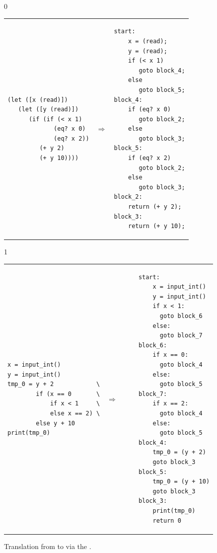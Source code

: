 \documentclass[7x10]{TimesAPriori_MIT}%
\def\racketEd{0}
\def\pythonEd{1}
\providecommand{\BookEdition}{1}
\let\edition\BookEdition
\newcommand{\pythonColor}[0]{}
\numberwithin{theorem}{chapter}
\numberwithin{definition}{chapter}
\numberwithin{equation}{chapter}
\begin{document}
\begin{figure}[tbp]
\begin{tcolorbox}[colback=white]
{\if\edition\racketEd        
\begin{tabular}{lll}
\begin{minipage}{0.4\textwidth}
\begin{lstlisting}
(let ([x (read)])
   (let ([y (read)])
      (if (if (< x 1)
             (eq? x 0)
             (eq? x 2))
         (+ y 2)
         (+ y 10))))
\end{lstlisting}
\end{minipage}
&
$\Rightarrow$
&
\begin{minipage}{0.55\textwidth}
\begin{lstlisting}
start:
    x = (read);
    y = (read);
    if (< x 1)
       goto block_4;
    else
       goto block_5;
block_4:
    if (eq? x 0)
       goto block_2;
    else
       goto block_3;
block_5:
    if (eq? x 2)
       goto block_2;
    else
       goto block_3;
block_2:
    return (+ y 2);
block_3:
    return (+ y 10);
\end{lstlisting}
\end{minipage}
\end{tabular} 
\fi}
{\if\edition\pythonEd\pythonColor
\begin{tabular}{lll}
\begin{minipage}{0.4\textwidth}
\begin{lstlisting}
x = input_int()
y = input_int()
tmp_0 = y + 2            \
        if (x == 0       \
            if x < 1     \
            else x == 2) \
        else y + 10
print(tmp_0)
\end{lstlisting}
\end{minipage}
&
$\Rightarrow\qquad$
&
\begin{minipage}{0.55\textwidth}
\begin{lstlisting}
start:
    x = input_int()
    y = input_int()
    if x < 1:
      goto block_6
    else:
      goto block_7
block_6:
    if x == 0:
      goto block_4
    else:
      goto block_5
block_7:
    if x == 2:
      goto block_4
    else:
      goto block_5
block_4:
    tmp_0 = (y + 2)
    goto block_3
block_5:
    tmp_0 = (y + 10)
    goto block_3
block_3:
    print(tmp_0)
    return 0
\end{lstlisting}
\end{minipage}
\end{tabular} 
\fi}
\end{tcolorbox}
\caption{Translation from \LangIfANF{} to \LangCIf{}
  via the .}
\label{fig:explicate-control-s1-38}
\end{figure}
\end{document}
